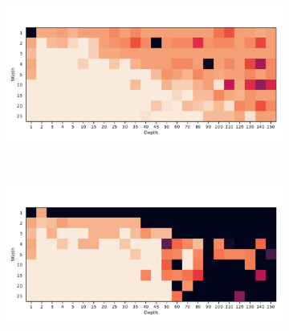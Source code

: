 \begin{figure}
\begin{subfigure}[b]{0.3\textwidth}
        \caption{\SepUnitPoint}
        \label{fig:moons_grid_up}
    \end{subfigure}
    ~ %
    \\
    \begin{subfigure}[b]{0.3\textwidth}
        \includegraphics[width=\textwidth]{img/moons_grid/acc-sep-u-0-0001.pdf}
        \caption{\SepUnit}
        \label{fig:moons_grid_u}
    \end{subfigure}
    ~ %
    \centering
    \begin{subfigure}[b]{0.3\textwidth}
        \includegraphics[width=\textwidth]{img/moons_grid/acc-sep-p-0-0001.pdf}
        \caption{\SepPoint}
        \label{fig:moons_grid_p}
    \end{subfigure}
    ~ %
    

\end{figure}
